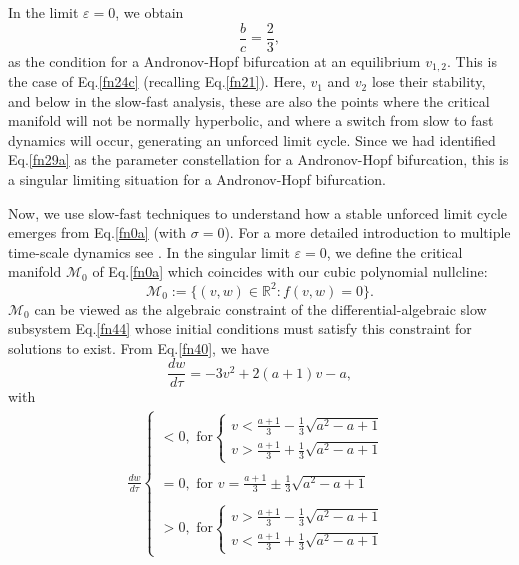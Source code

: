 In the limit $\varepsilon =0$, we obtain \begin{equation}\label{fn29a}
\frac{b}{c}=\frac{2}{3}, \end{equation} as the condition for a Andronov-Hopf
bifurcation at an equilibrium $v_{1,2}$. This is the case of
Eq.\eqref{fn24c} (recalling Eq.\eqref{fn21}). Here, $v_1$ and $v_2$
lose their stability, and below in the slow-fast analysis, these
are also the points where the critical manifold will not be
normally hyperbolic, and where a switch from slow to fast dynamics
will occur, generating an unforced limit cycle. Since we had
identified Eq.\eqref{fn29a} as the parameter constellation for a
Andronov-Hopf bifurcation, this is a singular limiting situation
for a Andronov-Hopf bifurcation.

Now, we use slow-fast techniques to understand how a stable unforced 
limit cycle emerges from Eq.\eqref{fn0a} (with $\sigma=0$). 
For a more detailed introduction
to multiple time-scale dynamics see \cite{Kuehn}. In the singular limit 
$\varepsilon=0$, we define the critical manifold $\mathcal{M}_0$ of Eq.\eqref{fn0a} 
which coincides with our cubic polynomial nullcline: \begin{equation}\label{fn40}
\mathcal{M}_0:=\Big\{(v,w)\in\mathbb{R}^2:f(v,w)=0\Big\}. \end{equation} 
$\mathcal{M}_0$ can be viewed as the algebraic constraint of the differential-algebraic 
slow subsystem Eq.\eqref{fn44} whose initial conditions must satisfy
this constraint for solutions to exist. From Eq.\eqref{fn40}, we have \begin{equation}\label{fn41}
\frac{dw}{d\tau}= -3v^2 +2(a+1)v-a,
\end{equation}
with
\begin{eqnarray}\label{fn42}
\frac{dw}{d\tau}\begin{cases}<0,\,\, \text{for} \begin{cases}v<\frac{a+1}{3}-\frac{1}{3}\sqrt{a^2-a +1} \\
v> \frac{a+1}{3} +\frac{1}{3}\sqrt{a^2-a +1}
                \end{cases}\\ \\
=0,\,\,\text{for}\,\,v=\frac{a+1}{3} \pm \frac{1}{3}\sqrt{a^2-a +1} \\
                \\ 
>0,\,\, \text{for} \begin{cases} v>\frac{a+1}{3} -\frac{1}{3}\sqrt{a^2-a +1}\\
v< \frac{a+1}{3} +\frac{1}{3}\sqrt{a^2-a +1}
                \end{cases}
                \end{cases}
\end{eqnarray}

